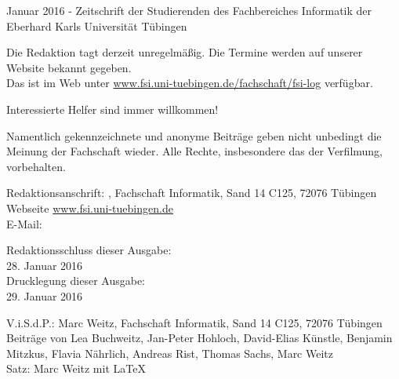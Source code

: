 \nameit \space \space Januar 2016 - Zeitschrift der Studierenden des Fachbereiches Informatik der Eberhard Karls Universität Tübingen

Die Redaktion tagt derzeit unregelmäßig. Die Termine werden auf unserer Website bekannt  gegeben.\\
Das \nameit \space ist  im  Web  unter \url{www.fsi.uni-tuebingen.de/fachschaft/fsi-log} verfügbar.

Interessierte Helfer sind immer willkommen!

Namentlich gekennzeichnete und anonyme Beiträge geben nicht unbedingt die Meinung der Fachschaft wieder. Alle Rechte, insbesondere das der Verfilmung, vorbehalten.

Redaktionsanschrift:
\nameit, Fachschaft Informatik, Sand 14 C125, 72076 Tübingen\\
Webseite \url{www.fsi.uni-tuebingen.de}\\
E-Mail:

Redaktionsschluss dieser Ausgabe:\\
28. Januar 2016\\
Drucklegung dieser Ausgabe:\\
29. Januar 2016

V.i.S.d.P.: Marc Weitz, Fachschaft Informatik, Sand 14 C125, 72076 Tübingen\\
Beiträge von Lea Buchweitz, Jan-Peter Hohloch, David-Elias Künstle, Benjamin Mitzkus, Flavia Nährlich, Andreas Rist, Thomas Sachs, Marc Weitz\\
Satz: Marc Weitz mit \LaTeX 


